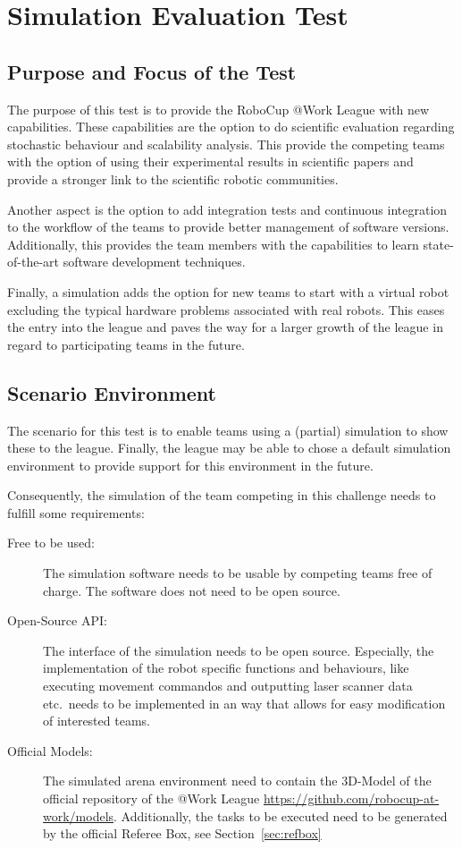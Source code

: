 \newpage
\section{Simulation Evaluation Test}

\subsection{Purpose and Focus of the Test}

The purpose of this test is to provide the RoboCup @Work League with new capabilities. These capabilities are the option to do scientific evaluation regarding stochastic behaviour and scalability analysis. This provide the competing teams with the option of using their experimental results in scientific papers and provide a stronger link to the scientific robotic communities.

Another aspect is the option to add integration tests and continuous integration to the workflow of the teams to provide better management of software versions. Additionally, this provides the team members with the capabilities to learn state-of-the-art software development techniques.

Finally, a simulation adds the option for new teams to start with a virtual robot excluding the typical hardware problems associated with real robots. This eases the entry into the league and paves the way for a larger growth of the league in regard to participating teams in the future. 

\subsection{Scenario Environment}

The scenario for this test is to enable teams using a (partial) simulation to show these to the league. Finally, the league may be able to chose a default simulation environment to provide support for this environment in the future. 

Consequently, the simulation of the team competing in this challenge needs to fulfill some requirements:

\begin{description}
  \item[Free to be used:] The simulation software needs to be usable by competing teams free of charge. The software does not need to be open source.
  \item[Open-Source API:] The interface of the simulation needs to be open source. Especially, the implementation of the robot specific functions and behaviours, like executing movement commandos and outputting laser scanner data etc.\ needs to be implemented in an way that allows for easy modification of interested teams.
  \item[Official Models:] The simulated arena environment need to contain the 3D-Model of the official repository of the @Work League \url{https://github.com/robocup-at-work/models}. Additionally, the tasks to be executed need to be generated by the official Referee Box, see Section~\ref{sec:refbox}
\end{description}

